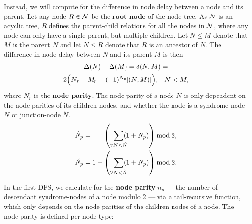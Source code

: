 Instead, we will compute for the difference in node delay between a node and its parent. Let any node $R\in\mathcal{N}$ be the \textbf{root node} of the node tree. As $\mathcal{N}$ is an acyclic tree, $R$ defines the parent-child relations for all the nodes in $\mathcal{N}$, where any node can only have a single parent, but multiple children. Let $N\leq M$ denote that $M$ is the parent $N$ and let $N\leq R$ denote that $R$ is an ancestor of $N$. The difference in node delay between $N$ and its parent $M$ is then
\begin{multline}\label{eq:pmwdif}
    \Delta(N) - \Delta(M) = \delta(N,M) = \\
    2\Big(N_r-M_r - (-1)^{N_p}\lvert(N,M)\rvert\Big), \hspace{.3cm} N<M,
\end{multline}
where $N_p$ is the \textbf{node parity}. The node parity of a node $N$ is only dependent on the node parities of its children nodes, and whether the node is a syndrome-node $\dot{N}$ or junction-node $\check{N}$. 
\begin{align}\label{eq:nodeparity}
    \dot{N}_p &= \hspace{.6cm}\left(\hspace{.2cm} \sum_{\mathclap{\forall N < \dot{N}}} (1+N_p) \right ) \bmod 2,\\
    \check{N}_p &= 1 - \left(\hspace{.2cm} \sum_{\mathclap{\forall N < \check{N}}} (1+N_p) \right) \bmod 2.
\end{align}



In the first DFS, we calculate for the \textbf{node parity} $n_p$ --- the number of descendant syndrome-nodes of a node modulo 2 --- via a tail-recursive function, which only depends on the node parities of the children nodes of a node. The node parity is defined per node type:

